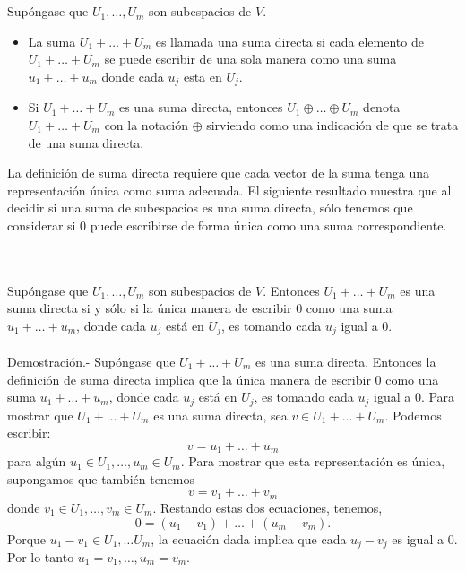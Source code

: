     \begin{mydef}\,\\\\
	Supóngase que $U_1,\ldots, U_m$ son subespacios de $V$.
	\begin{itemize}
	    \item La suma $U_1+\ldots + U_m$ es llamada una suma directa si cada elemento de $U_1+\ldots + U_m$ se puede escribir de una sola manera como una suma  $u_1 + \ldots + u_m$ donde cada $u_j$ esta en $U_j$.
	    \item Si $U_1 + \ldots + U_m$ es una suma directa, entonces $U_1 \oplus \ldots \oplus U_m$ denota $U_1 + \ldots + U_m$ con la notación $\oplus$ sirviendo como una indicación de que se trata de una suma directa.
	\end{itemize}
    \end{mydef}
\vspace{.5cm}

La definición de suma directa requiere que cada vector de la suma tenga una representación única como suma adecuada. El siguiente resultado muestra que al decidir si una suma de subespacios es una suma directa, sólo tenemos que considerar si 0 puede escribirse de forma única como una suma correspondiente.\\

\setcounter{myteo}{43}
\begin{myteo}\,\\\\
    Supóngase que $U_1,\ldots, U_m$ son subespacios de $V$. Entonces $U_1+\ldots + U_m$ es una suma directa si y sólo si la única manera de escribir $0$ como una suma $u_1 + \ldots + u_m$, donde cada $u_j$ está en $U_j$, es tomando cada $u_j$ igual a $0$.\\\\
	Demostración.-\; Supóngase que $U_1+\ldots + U_m$ es una suma directa. Entonces la definición de suma directa implica que la única manera de escribir $0$ como una suma $u_1 + \ldots + u_m$, donde cada $u_j$ está en $U_j$, es tomando cada $u_j$ igual a $0$. Para mostrar que $U_1 + \ldots + U_m$ es una suma directa, sea $v \in U_1 + \ldots + U_m$. Podemos escribir:
	$$v = u_1 + \ldots + u_m$$
	para algún $u_1 \in U_1 , \ldots, u_m \in U_m$. Para mostrar que esta representación es única, supongamos que también tenemos
	$$v = v_1 + \ldots + v_m$$
	donde $v_1 \in U_1,\ldots , v_m \in U_m$. Restando estas dos ecuaciones, tenemos,
	$$0=(u_1-v_1)+\ldots + (u_m - v_m).$$
	Porque $u_1-v_1\in U_1,\ldots U_m$, la ecuación dada implica que cada $u_j - v_j$ es igual a $0$. Por lo tanto $u_1 = v_1, \ldots , u_m = v_m$.
\end{myteo}
\vspace{.5cm}

